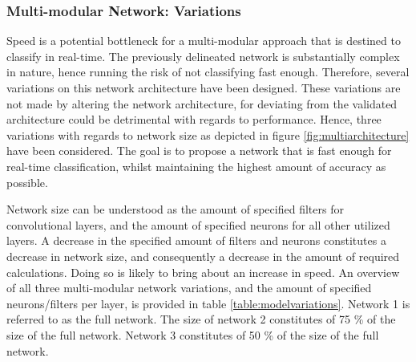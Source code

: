 \documentclass[12pt]{article}
\begin{document}
\subsubsection{Multi-modular Network: Variations}
Speed is a potential bottleneck for a multi-modular approach that is destined to classify in real-time. The previously delineated network is substantially complex in nature, hence running the risk of not classifying fast enough. Therefore, several variations on this network architecture have been designed. These variations are not made by altering the network architecture, for deviating from the validated architecture could be detrimental with regards to performance. Hence, three variations with regards to network size as depicted in figure \ref{fig:multiarchitecture} have been considered. The goal is to propose a network that is fast enough for real-time classification, whilst maintaining the highest amount of accuracy as possible. 

Network size can be understood as the amount of specified filters for convolutional layers, and the amount of specified neurons for all other utilized layers. A decrease in the specified amount of filters and neurons constitutes a decrease in network size, and consequently a decrease in the amount of required calculations. Doing so is likely to bring about an increase in speed. An overview of all three multi-modular network variations, and the amount of specified neurons/filters per layer, is provided in table \ref{table:modelvariations}. Network 1 is referred to as the full network. The size of network 2 constitutes of 75 \% of the size of the full network. Network 3 constitutes of 50 \% of the size of the full network.
\end{document}
